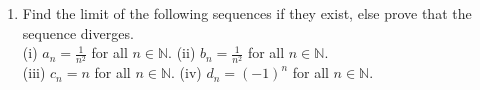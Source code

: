 \begin{enumerate}[label=(\arabic*)]
\begin{enumerate} [nosep]
		\item What is the relation between $A$ and $f^{-1}(f(A))?$ Is the containment proper? When does equality hold? Answer these questions for $B$ and $f(f^{-1}(B)).$
	\end{enumerate}
	\item Find the limit of the following sequences if they exist, else prove that the sequence diverges.\\
	(i) $a_n = \frac{1}{n^2}$ for all $n\in \mathbb{N}.$ \hfil (ii) $b_n = \frac{1}{n^2}$ for all $n \in \mathbb{N}.$\\	
	(iii) $c_n = n$ for all $n\in \mathbb{N}.$ \hfil (iv) $d_n = (-1)^n$ for all $n \in \mathbb{N}.$
\end{enumerate}